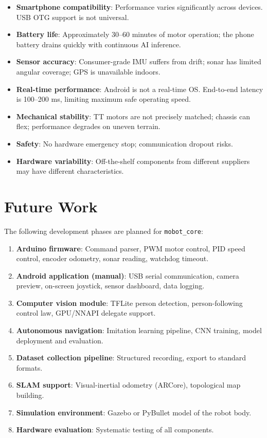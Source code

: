 \documentclass[12pt,a4paper]{article}
\begin{document}
\begin{itemize}
    \item \textbf{Smartphone compatibility}: Performance varies significantly across devices.
          USB OTG support is not universal.
    \item \textbf{Battery life}: Approximately 30--60 minutes of motor operation; the phone
          battery drains quickly with continuous AI inference.
    \item \textbf{Sensor accuracy}: Consumer-grade IMU suffers from drift; sonar has limited
          angular coverage; GPS is unavailable indoors.
    \item \textbf{Real-time performance}: Android is not a real-time OS. End-to-end latency
          is 100--200 ms, limiting maximum safe operating speed.
    \item \textbf{Mechanical stability}: TT motors are not precisely matched; chassis can flex;
          performance degrades on uneven terrain.
    \item \textbf{Safety}: No hardware emergency stop; communication dropout risks.
    \item \textbf{Hardware variability}: Off-the-shelf components from different suppliers
          may have different characteristics.
\end{itemize}

\section{Future Work}
\label{sec:future_work}

The following development phases are planned for \texttt{mobot\_core}:

\begin{enumerate}
    \item \textbf{Arduino firmware}: Command parser, PWM motor control, PID speed control,
          encoder odometry, sonar reading, watchdog timeout.
    \item \textbf{Android application (manual)}: USB serial communication, camera preview,
          on-screen joystick, sensor dashboard, data logging.
    \item \textbf{Computer vision module}: TFLite person detection, person-following
          control law, GPU/NNAPI delegate support.
    \item \textbf{Autonomous navigation}: Imitation learning pipeline, CNN training,
          model deployment and evaluation.
    \item \textbf{Dataset collection pipeline}: Structured recording, export to standard formats.
    \item \textbf{SLAM support}: Visual-inertial odometry (ARCore), topological map building.
    \item \textbf{Simulation environment}: Gazebo or PyBullet model of the robot body.
    \item \textbf{Hardware evaluation}: Systematic testing of all components.
\end{enumerate}
\end{document}
